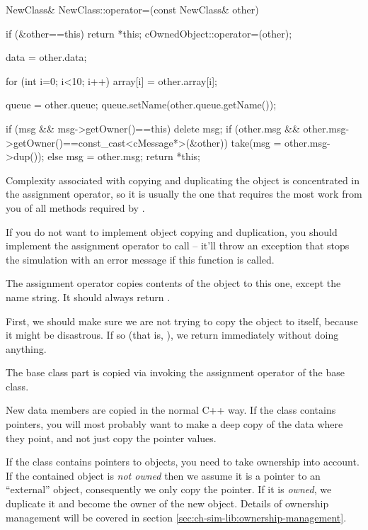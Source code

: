 \begin{cpp}
NewClass& NewClass::operator=(const NewClass& other)
{
    if (&other==this)
        return *this;
    cOwnedObject::operator=(other);

    data = other.data;

    for (int i=0; i<10; i++)
        array[i] = other.array[i];

    queue = other.queue;
    queue.setName(other.queue.getName());

    if (msg && msg->getOwner()==this)
        delete msg;
    if (other.msg && other.msg->getOwner()==const_cast<cMessage*>(&other))
        take(msg = other.msg->dup());
    else
        msg = other.msg;
    return *this;
}
\end{cpp}

Complexity associated with copying and duplicating the object
is concentrated in the assignment operator, so it is usually
the one that requires the most work from you of all methods
required by .

If you do not want to implement object copying and duplication,
you should implement the assignment operator to call
 -- it'll throw an exception that
stops the simulation with an error message if this function
is called.

The assignment operator copies contents of the  object
to this one, except the name string. It should always return
.

First, we should make sure we are not trying to copy the object
to itself, because it might be disastrous. If so (that is,
), we return immediately without doing anything.

The base class part is copied via invoking the assignment operator of
the base class.

New data members are copied in the normal C++ way. If the class
contains pointers, you will most probably want to make a deep copy of
the data where they point, and not just copy the pointer values.

If the class contains pointers to {\opp} objects, you need
to take ownership into account. If the contained object is \textit{not owned}
then we assume it is a pointer to an ``external'' object, consequently
we only copy the pointer. If it is \textit{owned}, we duplicate
it and become the owner of the new object. Details of ownership
management will be covered in section \ref{sec:ch-sim-lib:ownership-management}.


